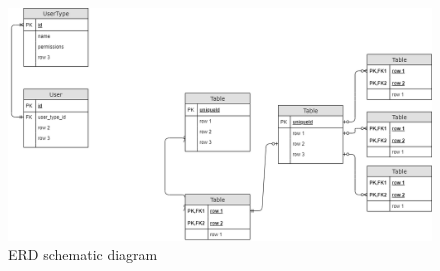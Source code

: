 \begin{figure}[h]
    \centering
    \includegraphics[width=\textwidth]{Include/Resources/Database/Project/databse_ERD_diagram.png}
    \caption{ERD schematic diagram}
    \label{fig:database_erd_schematic}
\end{figure}